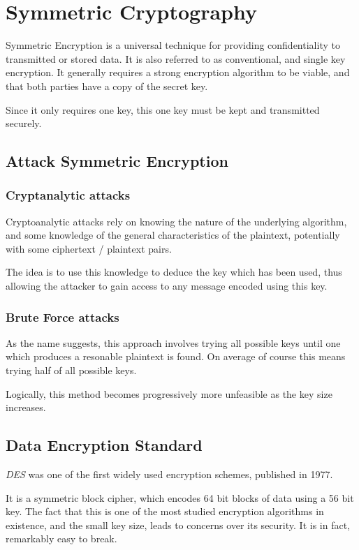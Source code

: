 \section{Symmetric Cryptography}

Symmetric Encryption is a universal technique for providing confidentiality to transmitted or stored data.
It is also referred to as conventional, and single key encryption. It generally requires a strong encryption 
algorithm to be viable, and that both parties have a copy of the secret key.

Since it only requires one key, this one key must be kept and transmitted securely.


\subsection{Attack Symmetric Encryption}

\subsubsection{Cryptanalytic attacks}
Cryptoanalytic attacks rely on knowing the nature of the underlying algorithm, and some knowledge of the general
characteristics of the plaintext, potentially with some ciphertext / plaintext pairs.

The idea is to use this knowledge to deduce the key which has been used, thus allowing the attacker to gain
access to any message encoded using this key.

\subsubsection{Brute Force attacks}
As the name suggests, this approach involves trying all possible keys until one which produces a resonable plaintext
is found. On average of course this means trying half of all possible keys.

Logically, this method becomes progressively more unfeasible as the key size increases.


\subsection{Data Encryption Standard}
\textit{DES} was one of the first widely used encryption schemes, published in 1977.

It is a symmetric block cipher, which encodes 64 bit blocks of data using a 56 bit key. The fact that this is one of the
most studied encryption algorithms in existence, and the small key size, leads to concerns over its security. It is in fact,
remarkably easy to break.

